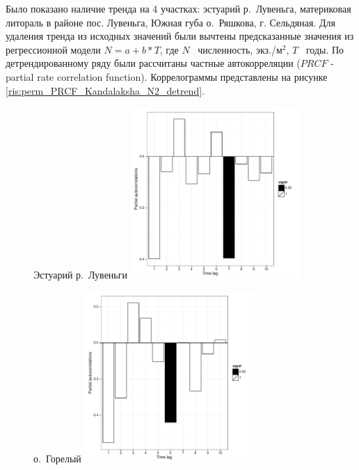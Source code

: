 \documentclass[12pt, a4paper]{disser}
\begin{document}
Было показано наличие тренда на 4 участках: эстуарий р.~Лувеньга, материковая литораль в районе пос. Лувеньга, Южная губа о.~Ряшкова, г. Сельдяная.
Для удаления тренда из исходных значений были вычтены предсказанные значения из регрессионной модели $N = a + b*T$, где $N$ \textemdash\ численность, экз./м$^2$, $T$ \textemdash\ годы.
По детрендированному ряду были рассчитаны частные автокорреляции ($PRCF$ - partial rate correlation function).  
Коррелограммы представлены на рисунке \ref{ris:perm_PRCF_Kandalaksha_N2_detrend}.
	\begin{figure}[ht]
	
	\begin{minipage}[b]{.46\linewidth}
	\begin{center}
	{\footnotesize Эстуарий р.~Лувеньги}
		\includegraphics[width=65mm]{../White_Sea/dynamic_N_N1/perm_PRCF_Estuary_detrend.pdf}

	\end{center}
	\end{minipage}
		\hfil %
	\begin{minipage}[b]{.46\linewidth}
	\begin{center}
	{\footnotesize о.~Горелый}
		\includegraphics[width=65mm]{../White_Sea/dynamic_N_N1/perm_PRCF_Goreliy_all_detrend.pdf}
	\end{center}
	\end{minipage}


\end{figure}
\end{document}
